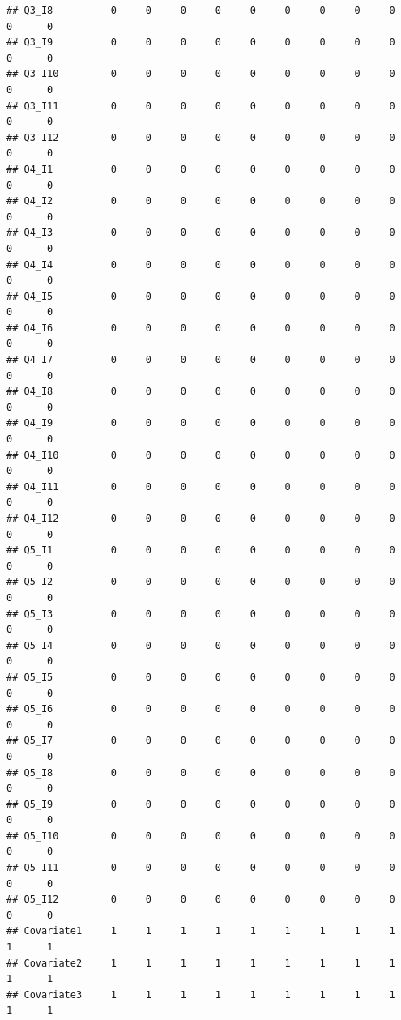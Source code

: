 \documentclass[
]{book}
\begin{document}
\begin{verbatim}
## Q3_I8          0     0     0     0     0     0     0     0     0      0      0
## Q3_I9          0     0     0     0     0     0     0     0     0      0      0
## Q3_I10         0     0     0     0     0     0     0     0     0      0      0
## Q3_I11         0     0     0     0     0     0     0     0     0      0      0
## Q3_I12         0     0     0     0     0     0     0     0     0      0      0
## Q4_I1          0     0     0     0     0     0     0     0     0      0      0
## Q4_I2          0     0     0     0     0     0     0     0     0      0      0
## Q4_I3          0     0     0     0     0     0     0     0     0      0      0
## Q4_I4          0     0     0     0     0     0     0     0     0      0      0
## Q4_I5          0     0     0     0     0     0     0     0     0      0      0
## Q4_I6          0     0     0     0     0     0     0     0     0      0      0
## Q4_I7          0     0     0     0     0     0     0     0     0      0      0
## Q4_I8          0     0     0     0     0     0     0     0     0      0      0
## Q4_I9          0     0     0     0     0     0     0     0     0      0      0
## Q4_I10         0     0     0     0     0     0     0     0     0      0      0
## Q4_I11         0     0     0     0     0     0     0     0     0      0      0
## Q4_I12         0     0     0     0     0     0     0     0     0      0      0
## Q5_I1          0     0     0     0     0     0     0     0     0      0      0
## Q5_I2          0     0     0     0     0     0     0     0     0      0      0
## Q5_I3          0     0     0     0     0     0     0     0     0      0      0
## Q5_I4          0     0     0     0     0     0     0     0     0      0      0
## Q5_I5          0     0     0     0     0     0     0     0     0      0      0
## Q5_I6          0     0     0     0     0     0     0     0     0      0      0
## Q5_I7          0     0     0     0     0     0     0     0     0      0      0
## Q5_I8          0     0     0     0     0     0     0     0     0      0      0
## Q5_I9          0     0     0     0     0     0     0     0     0      0      0
## Q5_I10         0     0     0     0     0     0     0     0     0      0      0
## Q5_I11         0     0     0     0     0     0     0     0     0      0      0
## Q5_I12         0     0     0     0     0     0     0     0     0      0      0
## Covariate1     1     1     1     1     1     1     1     1     1      1      1
## Covariate2     1     1     1     1     1     1     1     1     1      1      1
## Covariate3     1     1     1     1     1     1     1     1     1      1      1

\end{verbatim}
\end{document}
